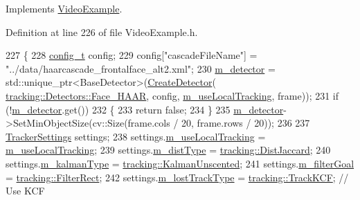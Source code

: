 Implements \mbox{\hyperlink{class_video_example_a93e23d64075fb2f508423e45d15c5421}{Video\+Example}}.



Definition at line 226 of file Video\+Example.\+h.


\begin{DoxyCode}
227     \{
228         \mbox{\hyperlink{defines_8h_a81d657237a541d02f8eeefdd40191920}{config\_t}} config;
229         config[\textcolor{stringliteral}{"cascadeFileName"}] = \textcolor{stringliteral}{"../data/haarcascade\_frontalface\_alt2.xml"};
230         \mbox{\hyperlink{class_video_example_a00fee4b18b68d605b87051f3bdaa1c92}{m\_detector}} = std::unique\_ptr<BaseDetector>(\mbox{\hyperlink{_base_detector_8cpp_a7648f35ed8e9d0160414d8e0eaf99c15}{CreateDetector}}(
      \mbox{\hyperlink{namespacetracking_a1edf574df68abf048988b7cbacc52760a4988e24edd891887cab51c40c8766469}{tracking::Detectors::Face\_HAAR}}, config, 
      \mbox{\hyperlink{class_video_example_a951ee017c4fbb180dfc965a9a35ac69f}{m\_useLocalTracking}}, frame));
231         \textcolor{keywordflow}{if} (!\mbox{\hyperlink{class_video_example_a00fee4b18b68d605b87051f3bdaa1c92}{m\_detector}}.get())
232         \{
233             \textcolor{keywordflow}{return} \textcolor{keyword}{false};
234         \}
235         \mbox{\hyperlink{class_video_example_a00fee4b18b68d605b87051f3bdaa1c92}{m\_detector}}->SetMinObjectSize(cv::Size(frame.cols / 20, frame.rows / 20));
236 
237         \mbox{\hyperlink{struct_tracker_settings}{TrackerSettings}} settings;
238         settings.\mbox{\hyperlink{struct_tracker_settings_a64f4e2f0b2eaeae47316690ab5a5e620}{m\_useLocalTracking}} = \mbox{\hyperlink{class_video_example_a951ee017c4fbb180dfc965a9a35ac69f}{m\_useLocalTracking}};
239         settings.\mbox{\hyperlink{struct_tracker_settings_a2633bd68c2d482a666a5d4bba580cca0}{m\_distType}} = \mbox{\hyperlink{namespacetracking_a55743c5e18b9b228c4ba2587260b2502a731b827afcbde6eb19624ad6130b1798}{tracking::DistJaccard}};
240         settings.\mbox{\hyperlink{struct_tracker_settings_a3856a809067135c1c3f2d3c61fc4d6b7}{m\_kalmanType}} = \mbox{\hyperlink{namespacetracking_a83f2c4d58ea2737f7d6296dce3eb722aa39d914d61ae37e52ad325f55d199dabc}{tracking::KalmanUnscented}};
241         settings.\mbox{\hyperlink{struct_tracker_settings_afd6c83aa8b0eaa4f131f45852a0b89e4}{m\_filterGoal}} = \mbox{\hyperlink{namespacetracking_a9b3e7d16c86cd8b781ab214e396b0ebfabb259eae9513c55b313c553ce6249aea}{tracking::FilterRect}};
242         settings.\mbox{\hyperlink{struct_tracker_settings_a61a59f1c5bcc2ee76cef1b174d4bb8a4}{m\_lostTrackType}} = \mbox{\hyperlink{namespacetracking_a5377d69122ad915004ef68a518d22be3a9bba8e4377e562caa976576d47c5eb2e}{tracking::TrackKCF}};    \textcolor{comment}{// Use KCF
}
\end{DoxyCode}

